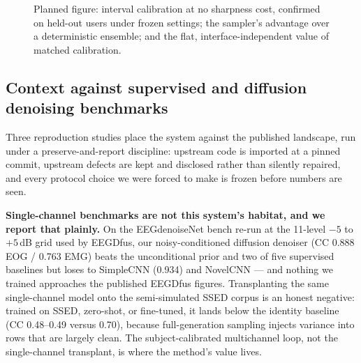 \begin{figure}[t]
  \centering
  \caption{Planned figure: interval calibration at no sharpness cost, confirmed on held-out users under frozen settings; the sampler's advantage over a deterministic ensemble; and the flat, interface-independent value of matched calibration.}
  \label{fig:uq}
\end{figure}

\subsection{Context against supervised and diffusion denoising benchmarks}
\label{sec:res-benchmarks}

Three reproduction studies place the system against the published landscape, run under a preserve-and-report discipline: upstream code is imported at a pinned commit, upstream defects are kept and disclosed rather than silently repaired, and every protocol choice we were forced to make is frozen before numbers are seen.

\textbf{Single-channel benchmarks are not this system's habitat, and we report that plainly.} On the EEGdenoiseNet bench re-run at the 11-level $-5$ to $+5$\,dB grid used by EEGDfus, our noisy-conditioned diffusion denoiser (CC 0.888 EOG / 0.763 EMG) beats the unconditional prior and two of five supervised baselines but loses to SimpleCNN (0.934) and NovelCNN --- and nothing we trained approaches the published EEGDfus figures. Transplanting the same single-channel model onto the semi-simulated SSED corpus is an honest negative: trained on SSED, zero-shot, or fine-tuned, it lands below the identity baseline (CC 0.48--0.49 versus 0.70), because full-generation sampling injects variance into rows that are largely clean. The subject-calibrated multichannel loop, not the single-channel transplant, is where the method's value lives.

